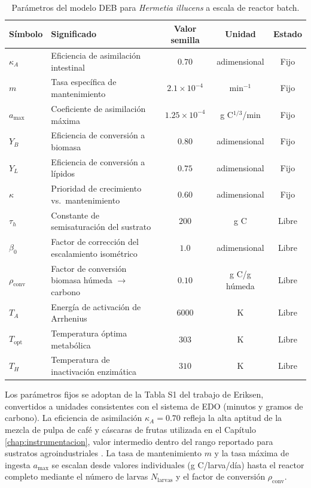 \begin{table}[htbp]
    \centering
    \caption{Parámetros del modelo DEB para \emph{Hermetia illucens} a escala de reactor batch.}
    \label{tab:cap3_parametros}
    \begin{tabular}{@{}llccc@{}}
        \toprule
        \textbf{Símbolo} & \textbf{Significado} & \textbf{Valor semilla} & \textbf{Unidad} & \textbf{Estado} \\
        \midrule
        $\kappa_A$ & Eficiencia de asimilación intestinal & $0.70$ & adimensional & Fijo \\
        $m$ & Tasa específica de mantenimiento & $2.1 \times 10^{-4}$ & min$^{-1}$ & Fijo \\
        $a_{\max}$ & Coeficiente de asimilación máxima & $1.25 \times 10^{-4}$ & g C$^{1/3}$/min & Fijo \\
        $Y_B$ & Eficiencia de conversión a biomasa & $0.80$ & adimensional & Fijo \\
        $Y_L$ & Eficiencia de conversión a lípidos & $0.75$ & adimensional & Fijo \\
        $\kappa$ & Prioridad de crecimiento vs.~mantenimiento & $0.60$ & adimensional & Fijo \\
        \midrule
        $\tau_h$ & Constante de semisaturación del sustrato & $200$ & g C & Libre \\
        $\beta_0$ & Factor de corrección del escalamiento isométrico & $1.0$ & adimensional & Libre \\
        $\rho_{\mathrm{conv}}$ & Factor de conversión biomasa húmeda $\rightarrow$ carbono & $0.10$ & g C/g húmeda & Libre \\
        $T_A$ & Energía de activación de Arrhenius & $6000$ & K & Libre \\
        $T_{\mathrm{opt}}$ & Temperatura óptima metabólica & $303$ & K & Libre \\
        $T_H$ & Temperatura de inactivación enzimática & $310$ & K & Libre \\
        \bottomrule
    \end{tabular}
\end{table}

Los parámetros fijos se adoptan de la Tabla S1 del trabajo de Eriksen, convertidos a unidades consistentes con el sistema de EDO (minutos y gramos de carbono). La eficiencia de asimilación $\kappa_A = 0.70$ refleja la alta aptitud de la mezcla de pulpa de café y cáscaras de frutas utilizada en el Capítulo \ref{chap:instrumentacion}, valor intermedio dentro del rango reportado para sustratos agroindustriales \parencite{guillaumeAsymptoticEstimatedDigestibility2023}. La tasa de mantenimiento $m$ y la tasa máxima de ingesta $a_{\max}$ se escalan desde valores individuales (g C/larva/día) hasta el reactor completo mediante el número de larvas $N_{\mathrm{larvas}}$ y el factor de conversión $\rho_{\mathrm{conv}}$.

